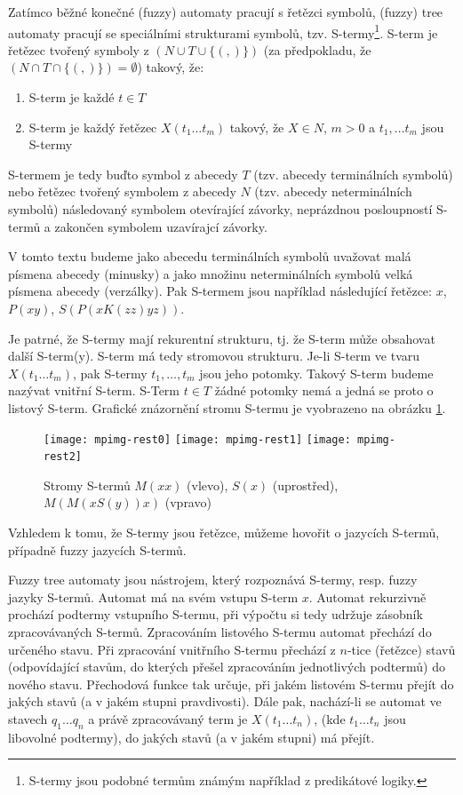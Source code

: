Zatímco běžné konečné (fuzzy) automaty pracují s řetězci symbolů, (fuzzy) tree automaty pracují se speciálními strukturami symbolů, tzv. S-termy\footnote{S-termy jsou podobné termům známým například z predikátové logiky.}. S-term je řetězec tvořený symboly z $(N \cup T \cup \{ (, ) \})$ (za předpokladu, že $(N \cap T \cap \{ (, ) \}) = \emptyset$) takový, že:
\begin{enumerate}
 \item S-term je každé $ t \in T$
 \item S-term je každý řetězec $ X ( t_1 \dots t_m )$ takový, že $X \in N$, $m > 0$ a $t_1, \dots t_m$ jsou S-termy
\end{enumerate}
S-termem je tedy buďto symbol z abecedy $T$ (tzv. abecedy terminálních symbolů) nebo řetězec tvořený symbolem z abecedy $N$ (tzv. abecedy neterminálních symbolů) následovaný symbolem otevírající závorky, neprázdnou posloupností S-termů a zakončen symbolem uzavírajcí závorky.

V tomto textu budeme jako abecedu terminálních symbolů uvažovat malá písmena abecedy (minusky) a jako množinu neterminálních symbolů velká písmena abecedy (verzálky). Pak S-termem jsou například následující řetězce: $x$, $P(x y)$, $S(P(x K(z z) y z))$.

Je patrné, že S-termy mají rekurentní strukturu, tj. že S-term může obsahovat další S-term(y). S-term má tedy stromovou strukturu. Je-li S-term ve tvaru $X(t_1 \dots t_m)$, pak S-termy $t_1, \dots, t_m$ jsou jeho potomky. Takový S-term budeme nazývat vnitřní S-term. S-Term $t \in T$ žádné potomky nemá a jedná se proto o listový S-term. Grafické znázornění stromu S-termu je vyobrazeno na obrázku \ref{img:Tree}.

\begin{figure}
  \centering
   \hfill
   \texttt{[image: mpimg-rest0]} 
   \hfill
   \texttt{[image: mpimg-rest1]}
   \hfill
   \texttt{[image: mpimg-rest2]}
   \hfill
 \caption[Stromy S-termů]{Stromy S-termů $M(xx)$ (vlevo), $S(x)$ (uprostřed), $M(M(x S(y)) x)$ (vpravo)} \label{img:Tree}
\end{figure}

Vzhledem k tomu, že S-termy jsou řetězce, můžeme hovořit o jazycích S-termů, případně fuzzy jazycích S-termů. 

Fuzzy tree automaty jsou nástrojem, který rozpoznává S-termy, resp. fuzzy jazyky S-termů. Automat má na svém vstupu S-term $x$. Automat rekurzivně prochází podtermy vstupního S-termu, při výpočtu si tedy udržuje zásobník zpracovávaných S-termů. Zpracováním listového S-termu automat přechází do určeného stavu. Při zpracování vnitřního S-termu přechází z $n$-tice (řetězce) stavů (odpovídající stavům, do kterých přešel zpracováním jednotlivých podtermů) do nového stavu. Přechodová funkce tak určuje, při jakém listovém S-termu přejít do jakých stavů (a v jakém stupni pravdivosti). Dále pak, nachází-li se automat ve stavech $q_1 \dots q_n$ a právě zpracovávaný term je $X(t_1 \dots t_n)$, (kde $t_1 \dots t_n$ jsou libovolné podtermy), do jakých stavů (a v jakém stupni) má přejít.

